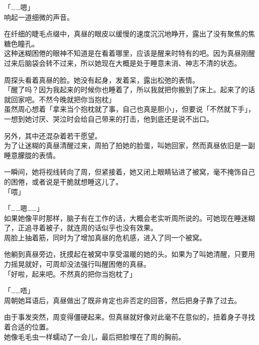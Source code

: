 「……嗯」\\

响起一道细微的声音。

在纤细的睫毛点缀中，真昼的眼皮以缓慢的速度沉沉地睁开，露出了没有聚焦的焦糖色瞳孔。\\

这种迷糊困倦的眼神不知道是在看着哪里，应该是醒来时特有的吧。因为真昼刚醒过来后脑袋会转不过来，所以她现在大概是处于睡意未消、神志不清的状态。

周探头看着真昼的脸。她没有起身，发着呆，露出松弛的表情。\\

「醒了吗？因为我起来的时候你也睡着了，所以我就把你搬到了床上。起来了的话就回家吧。不然今晚就把你当抱枕」\\

虽然周心想着「拿来当个抱枕就了事，自己也真是胆小」，但要说「不然就下手」，一想到她讨厌、哭泣时会给自己带来的打击，他到底还是说不出口。

另外，其中还混杂着若干愿望。\\

为了让迷糊的真昼清醒过来，周拍了拍她的脸蛋，叫她回家，然而真昼依旧是一副睡意朦胧的表情。

一瞬间，她将视线转向了周，但紧接着，她又闭上眼睛钻进了被窝，毫不掩饰自己的困倦，或者说是干脆就想睡这儿了。\\

「喂」

「……嗯……」\\

如果她像平时那样，脑子有在工作的话，大概会老实听周所说的。可她现在睡迷糊了，正追寻着被子，就连周的话似乎也没有效果。\\

周脸上抽着筋，同时为了增加真昼的危机感，进入了同一个被窝。

他躺到真昼旁边，抚摸起在被窝中享受温暖的她的头。如果为了叫她清醒，只要用力摇晃就好，可周却没法强行叫醒困倦的真昼。\\

「好啦，起来吧。不然真的把你当抱枕了」

「……唔」\\

周朝她耳语后，真昼做出了既非肯定也非否定的回答，然后把身子靠了过去。

由于事发突然，周变得僵硬起来。但真昼就好像对此毫不在意似的，扭着身子寻找着合适的位置。\\

她像毛毛虫一样蠕动了一会儿，最后把脸埋在了周的胸前。


